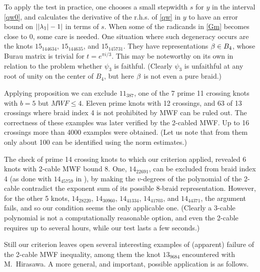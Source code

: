 \begin{rem}
To apply the test in practice, one chooses a small stepwidth $s$
for $y$ in the interval \eqref{qw0}, and calculates the derivative
of the r.h.s. of \eqref{qw} in $y$ to have an error bound on
$||\lambda_1|-1|$ in terms of $s$. When some of the radicands in \eqref{Gm}
becomes close to $0$, some care is needed. One situation where
such degeneracy occurs are the knots $15_{144634}$, $15_{144635}$,
and $15_{145731}$. They have representations $\beta\in B_4$, whose
Burau matrix is trivial for $t=e^{\pi i/3}$. This may be noteworthy
on its own in relation to the problem whether $\psi_3$ is faithful. 
(Clearly $\psi_3$ is unfaithful at any root of unity on the
center of $B_4$, but here $\beta$ is not even a pure braid.)
\end{rem}

\begin{exam}
Applying proposition  we can exclude $11_{387}$, one
of the 7 prime 11 crossing knots with $b=5$ but $MWF\le 4$. Eleven
prime knots with 12 crossings, and 63 of 13 crossings where braid
index 4 is not prohibited by MWF can be ruled out. The correctness
of these examples was later verified by the 2-cabled MWF. Up to 16
crossings more than 4000 examples were obtained. (Let us note that
from them only about 100 can be identified using the norm estimates.)
\end{exam}

\begin{exam}
The check of prime 14 crossing knots to which our criterion applied,
revealed 6 knots with 2-cable MWF bound 8. One, $14_{22691}$,
can be excluded from braid index 4 (as done with $14_{45759}$ 
in \cite{posex_bcr}), by making the $v$-degrees of the
polynomial of the 2-cable contradict the exponent sum of its
possible 8-braid representation. However, for the other 5
knots, $14_{28220}$, $14_{30960}$, $14_{41334}$, $14_{41703}$,
and $14_{44371}$, the argument fails, and so our condition
seems the only applicable one. (Clearly a 3-cable polynomial
is not a computationally reasonable option, and even the 2-cable
requires up to several hours, while our test lasts a few seconds.)
\end{exam}

Still our criterion leaves open several interesting examples
of (apparent) failure of the 2-cable MWF inequality, among
them the knot $13_{9684}$ encountered with M.~Hirasawa. A more
general, and important, possible application is as follows.


